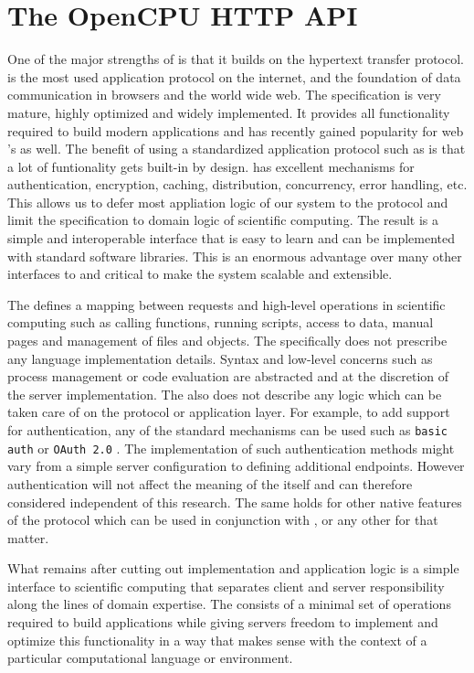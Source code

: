 \section{The OpenCPU HTTP API}

One of the major strengths of \OpenCPU is that it builds on the hypertext transfer protocol. \HTTP is the most used application protocol on the internet, and the foundation of data communication in browsers and the world wide web. The \HTTP specification is very mature, highly optimized and widely implemented. It provides all functionality required to build modern applications and has recently gained popularity for web \API's as well. The benefit of using a standardized application protocol such as \HTTP is that a lot of funtionality gets built-in by design. \HTTP has excellent mechanisms for authentication, encryption, caching, distribution, concurrency, error handling, etc. This allows us to defer most appliation logic of our system to the protocol and limit the \API specification to domain logic of scientific computing. The result is a simple and interoperable interface that is easy to learn and can be implemented with standard \HTTP software libraries. This is an enormous advantage over many other interfaces to \R and critical to make the system scalable and extensible. 

The \OpenCPU \API defines a mapping between \HTTP requests and high-level operations in scientific computing such as calling functions, running scripts, access to data, manual pages and management of files and objects. The \API specifically does not prescribe any language implementation details. Syntax and low-level concerns such as process management or code evaluation are abstracted and at the discretion of the server implementation. The \API also does not describe any logic which can be taken care of on the protocol or application layer. For example, to add support for authentication, any of the standard mechanisms can be used such as \texttt{basic auth} \citep{franks1999rfc} or \texttt{OAuth 2.0} \citep{hardt2012oauth}. The implementation of such authentication methods might vary from a simple server configuration to defining additional endpoints. However authentication will not affect the meaning of the \API itself and can therefore considered independent of this research. The same holds for other native features of the \HTTP protocol which can be used in conjunction with \OpenCPU, or any other \HTTP \API for that matter. 

What remains after cutting out implementation and application logic is a simple interface to scientific computing that separates client and server responsibility along the lines of domain expertise. The \OpenCPU \API consists of a minimal set of operations required to build applications while giving servers freedom to implement and optimize this functionality in a way that makes sense with the context of a particular computational language or environment. 

